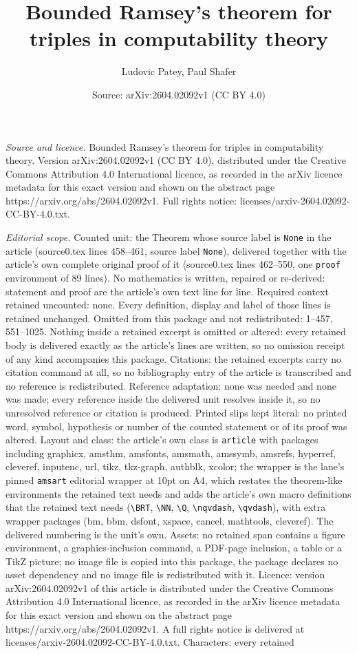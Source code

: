 \documentclass[10pt,a4paper]{amsart}
\title[Bounded Ramsey's theorem for triples in computability theory]{Bounded Ramsey's theorem for triples in computability theory}
\author{Ludovic Patey, Paul Shafer}
\date{Source: arXiv:2604.02092v1 (CC BY 4.0)}
\begin{document}
\maketitle

\noindent\emph{Source and licence.} Bounded Ramsey's theorem for triples in computability theory. Version arXiv:2604.02092v1 (CC BY 4.0), distributed under the Creative Commons Attribution 4.0 International licence, as recorded in the arXiv licence metadata for this exact version and shown on the abstract page https://arxiv.org/abs/2604.02092v1. Full rights notice: licenses/arxiv-2604.02092-CC-BY-4.0.txt.\par\smallskip

\noindent\textit{Editorial scope.} Counted unit: the Theorem whose source label is \texttt{None} in the article (source0.tex lines 458--461, source label \texttt{None}), delivered together with the article's own complete original proof of it (source0.tex lines 462--550, one \texttt{proof} environment of 89 lines). No mathematics is written, repaired or re-derived: statement and proof are the article's own text line for line. Required context retained uncounted: none. Every definition, display and label of those lines is retained unchanged. Omitted from this package and not redistributed: 1--457, 551--1025. Nothing inside a retained excerpt is omitted or altered: every retained body is delivered exactly as the article's lines are written, so no omission receipt of any kind accompanies this package. Citations: the retained excerpts carry no citation command at all, so no bibliography entry of the article is transcribed and no reference is redistributed. Reference adaptation: none was needed and none was made; every reference inside the delivered unit resolves inside it, so no unresolved reference or citation is produced. Printed slips kept literal: no printed word, symbol, hypothesis or number of the counted statement or of its proof was altered. Layout and class: the article's own class is \texttt{article} with packages including graphicx, amsthm, amsfonts, amsmath, amssymb, amsrefs, hyperref, cleveref, inputenc, url, tikz, tkz-graph, authblk, xcolor; the wrapper is the lane's pinned \texttt{amsart} editorial wrapper at 10pt on A4, which restates the theorem-like environments the retained text needs and adds the article's own macro definitions that the retained text needs (\texttt{\textbackslash BRT}, \texttt{\textbackslash NN}, \texttt{\textbackslash Q}, \texttt{\textbackslash nqvdash}, \texttt{\textbackslash qvdash}), with extra wrapper packages (bm, bbm, dsfont, xspace, cancel, mathtools, cleveref). The delivered numbering is the unit's own. Assets: no retained span contains a figure environment, a graphics-inclusion command, a PDF-page inclusion, a table or a TikZ picture; no image file is copied into this package, the package declares no asset dependency and no image file is redistributed with it. Licence: version arXiv:2604.02092v1 of this article is distributed under the Creative Commons Attribution 4.0 International licence, as recorded in the arXiv licence metadata for this exact version and shown on the abstract page https://arxiv.org/abs/2604.02092v1. A full rights notice is delivered at licenses/arxiv-2604.02092-CC-BY-4.0.txt. Characters: every retained 
\end{document}
